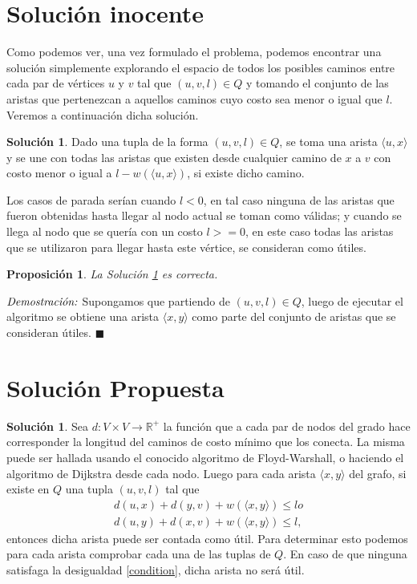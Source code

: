 \documentclass[10pt]{amsart}
\newtheorem{prop}[theorem]{Proposici\'on}
\theoremstyle{definition}
\newtheorem{sol}[theorem]{Soluci\'on}
\numberwithin{equation}{section}
\newcommand{\lqqd}{{\small $\blacksquare$}}
\newcommand{\Proof}[2]{{\vspace{1em} $\emph{Demostración:}$ \textbf{#1} #2 \lqqd \vspace{1em}}}
\newcommand{\rr}{\mathbb{R}}
\newcommand{\edge}[1]{\langle #1\rangle}
\begin{document}
\section{Solución inocente}
    Como podemos ver, una vez formulado el problema, podemos encontrar una solución simplemente explorando el espacio de todos los posibles caminos entre cada par de vértices $u$ y $v$ tal que $(u, v, l) \in Q$ y tomando el conjunto de las aristas que pertenezcan a aquellos caminos cuyo costo sea menor o igual que $l$. Veremos a continuación dicha solución.
    
    \begin{sol}\label{sol_backtracking_travel}
        Dado una tupla de la forma $(u, v, l) \in Q$, se toma una arista $\edge{u, x}$ y se une con todas las aristas que existen desde cualquier camino de $x$ a $v$ con costo menor o igual a $l - w(\edge{u,x})$, si existe dicho camino. 

        Los casos de parada serían cuando $l < 0$, en tal caso ninguna de las aristas que fueron obtenidas hasta llegar al nodo actual se toman como válidas; y cuando se llega al nodo que se quería con un costo $l >= 0$, en este caso todas las aristas que se utilizaron para llegar hasta este vértice, se consideran como útiles. 
    \end{sol} 

    \begin{prop}
	La Soluci\'on \ref{sol_backtracking_travel} es correcta.
    \end{prop}

    \Proof{}{
        Supongamos que partiendo de $(u, v, l) \in Q$, luego de ejecutar el algoritmo se obtiene una arista $\edge{x,y}$ 
        como parte del conjunto de aristas que se consideran útiles.
    }

\section{Soluci\'on Propuesta}
	
	\begin{sol}\label{sol_optima_travel} Sea $d \colon V \times V \rightarrow \rr^+$ la funci\'on que a cada par de nodos del grado hace corresponder la longitud del caminos de costo m\'inimo que los conecta. La misma puede ser hallada usando el conocido algoritmo de Floyd-Warshall, o haciendo el algoritmo de Dijkstra desde cada nodo. Luego para cada arista $\edge{x,y}$ del grafo, si existe en $Q$ una tupla $(u,v,l)$ tal que
		\begin{align}\label{condition}
			d(u,x) + d(y,v) + w \left(\edge{x, y} \right) \le l o \\
		\label{condition2}	d(u,y) + d(x,v) + w \left(\edge{x, y} \right) \le l,
		\end{align}
		entonces dicha arista puede ser contada como \'util. Para determinar esto podemos para cada arista comprobar cada una de las tuplas de $Q$. En caso de que ninguna satisfaga la desigualdad \eqref{condition}, dicha arista no ser\'a \'util.
	\end{sol}
\end{document}
